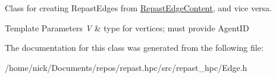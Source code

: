 Class for creating Repast\-Edges from \hyperlink{structrepast_1_1_repast_edge_content}{Repast\-Edge\-Content}, and vice versa. 


\begin{DoxyTemplParams}{Template Parameters}
{\em V} & type for vertices; must provide Agent\-I\-D \\
\hline
\end{DoxyTemplParams}


The documentation for this class was generated from the following file\-:\begin{DoxyCompactItemize}
\item 
/home/nick/\-Documents/repos/repast.\-hpc/src/repast\-\_\-hpc/Edge.\-h\end{DoxyCompactItemize}
